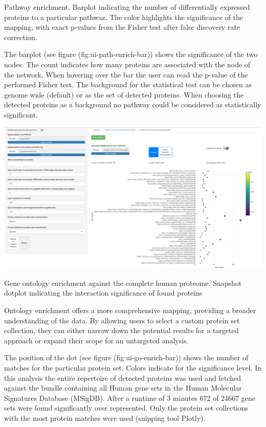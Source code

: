\documentclass[
  11pt,
]{article}
\let\origfigure\figure
\begin{document}
\caption{Pathway enrichment. Barplot indicating the number of differentially expressed proteins to a particular pathwaz. The color highlights the significance of the mapping, with exact p-values from the Fisher test after false discovery rate correction.}\label{fig:ui-path-enrich-bar}
 \endfigure\egroup

The barplot (see figure (fig:ui-path-enrich-bar)) shows the significance of the two nodes. The count indicates how many proteins are associated with the node of the network. When hovering over the bar the user can read the p-value of the performed Fisher test. The background for the statistical test can be chosen as genome wide (default) or as the set of detected proteins. When choosing the detected proteins as a background no pathway could be considered as statistically significant.

\newpage
\bgroup  \origfigure[H] 

{\centering \includegraphics[width=0.9\linewidth]{screenshots/go_enrich_dot} 

}

\caption{Gene ontology enrichment against the complete human proteome. Snapshot dotplot indicating the interaction significance of found proteins}\label{fig:ui-go-enrich-bar}
 \endfigure\egroup

Ontology enrichment offers a more comprehensive mapping, providing a broader understanding of the data. By allowing users to select a custom protein set collection, they can either narrow down the potential results for a targeted approach or expand their scope for an untargeted analysis.

The position of the dot (see figure (fig:ui-go-enrich-bar)) shows the number of matches for the particular protein set. Colors indicate for the significance level. In this analysis the entire repertoire of detected proteins was used and fetched against the bundle containing all Human gene sets in the Human Molecular Signatures Database (MSigDB). After a runtime of 3 minutes 672 of 24667 gene sets were found significantly over represented. Only the protein set collections with the most protein matches were used (snipping tool Plotly).
\end{document}
